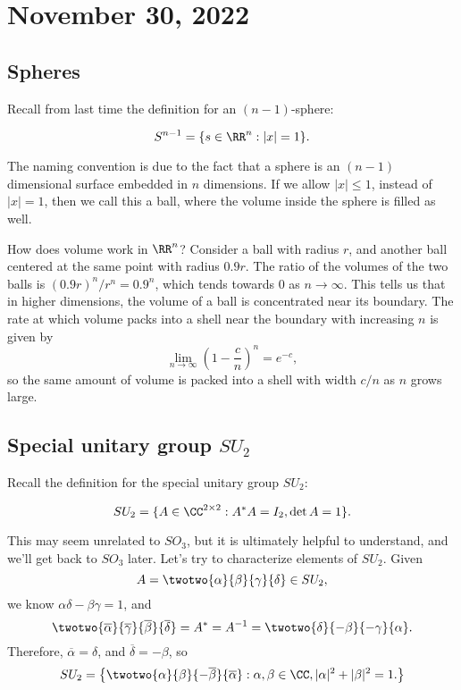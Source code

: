 \section{November 30, 2022}

\subsection{Spheres}

Recall from last time the definition for an $(n-1)$-sphere:
\begin{definition}
\[S^{n-1} = \{s\in \RR^n : \vert x\vert =1\}.\]
\end{definition}

The naming convention is due to the fact that a sphere is an $(n-1)$ dimensional surface embedded in $n$ dimensions. If we allow $\vert x\vert \leq 1$, instead of $\vert x\vert = 1$, then we call this a \ac{ball}, where the volume inside the sphere is filled as well. 

How does volume work in $\RR^n$? Consider a ball with radius $r$, and another ball centered at the same point with radius $0.9r$. The ratio of the volumes of the two balls is $(0.9r)^n/r^n = 0.9^n$, which tends towards $0$ as $n\rightarrow \infty$. This tells us that in higher dimensions, the volume of a ball is concentrated near its boundary. The rate at which volume packs into a shell near the boundary with increasing $n$ is given by
\[\lim_{n\rightarrow \infty}\left(1-\frac{c}{n}\right)^n=e^{-c},\]
so the same amount of volume is packed into a shell with width $c/n$ as $n$ grows large.

\subsection{Special unitary group $SU_2$}

Recall the definition for the special unitary group $SU_2$:

\begin{definition}
\[SU_2 = \{A\in \CC^{2\times 2} : A^*A = I_2, \det{A}=1\}.\]
\end{definition}

This may seem unrelated to $SO_3$, but it is ultimately helpful to understand, and we'll get back to $SO_3$ later. Let's try to characterize elements of $SU_2$. Given
\[A = \twotwo{\alpha}{\beta}{\gamma}{\delta}\in SU_2,\]
we know $\alpha\delta-\beta\gamma=1$, and
\[\twotwo{\overline{\alpha}}{\overline{\gamma}}{\overline{\beta}}{\overline{\delta}} = A^* = A^{-1} = \twotwo{\delta}{-\beta}{-\gamma}{\alpha}.\]
Therefore, $\overline{\alpha} = \delta$, and $\overline{\delta} = -\beta$, so 
\[SU_2 = \left\{\twotwo{\alpha}{\beta}{-\overline{\beta}}{\overline{\alpha}} : \alpha,\beta \in \CC, \vert \alpha\vert^2+\vert \beta\vert^2 = 1.\right\}\]

